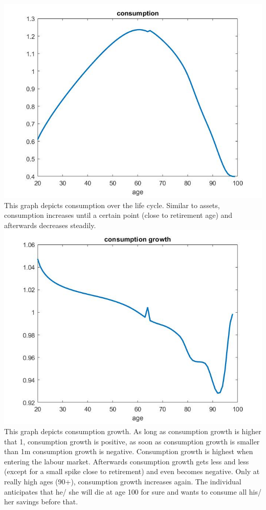 \documentclass[12pt,a4paper]{article}
\begin{document}
\includegraphics[width=14cm]{Graphs/Figure10} \\
This graph depicts consumption over the life cycle. Similar to assets, consumption increases until a certain point (close to retirement age) and afterwards decreases steadily. \\
\includegraphics[width=14cm]{Graphs/Figure11} \\
This graph depicts consumption growth. As long as consumption growth is higher that 1, consumption growth is positive, as soon as consumption growth is smaller than 1m consumption growth is negative. Consumption growth is highest when entering the labour market. Afterwards consumption growth gets less and less (except for a small spike close to retirement) and even becomes negative. Only at really high ages (90+), consumption growth increases again. The individual anticipates that he/ she will die at age 100 for sure and wants to consume all his/ her savings before that. \\
\end{document}
